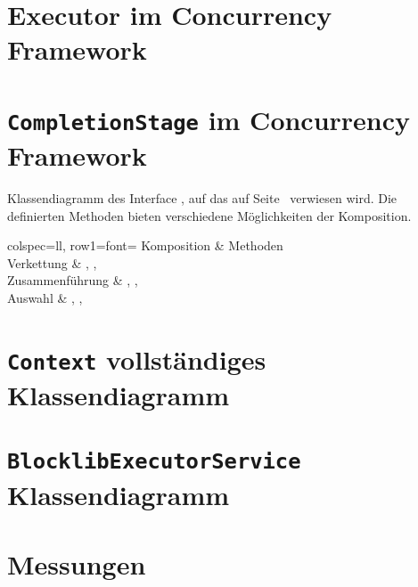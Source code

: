 \appendix
\clearpage
\renewcommand{\sectionmark}[1]{\markboth{\Ifnumbered{section}{Anhang \thesection}{}}{#1}}
\setcounter{page}{1}


\section{Executor im Concurrency Framework}\label{appendix:concFrameworkExecutor}


\section{\texttt{CompletionStage} im Concurrency Framework}\label{appendix:CompletionStage}

Klassendiagramm des Interface , auf das auf Seite~\pageref{sec:CompletableFuture} verwiesen wird. Die definierten Methoden bieten verschiedene Möglichkeiten der Komposition.

\begin{tblr}{
	colspec={ll},
	row{1}={font=\bfseries}
	}
	Komposition & Methoden \\
	Verkettung & , , \\
	Zusammenführung & , ,  \\
	Auswahl & , ,  \\
\end{tblr}

\pagebreak
\section{\texttt{Context} vollständiges Klassendiagramm}\label{appendix:context}
{
	\centering
	
}

\pagebreak
\section{\texttt{BlocklibExecutorService} Klassendiagramm}\label{appendix:BlocklibExecutorService}
{
	\centering
	
}
\pagebreak
\section{Messungen}
